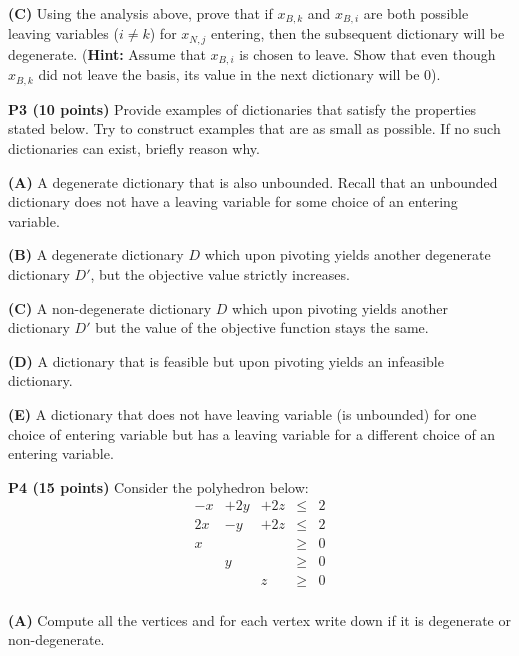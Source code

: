 \documentclass[11pt]{article}
\begin{document}
\medskip


\noindent\textbf{(C)} Using the analysis above, prove that if $x_{B,k}$
and $x_{B,i}$ are both possible leaving variables ($i \not= k$) for $x_{N,j}$ entering,
then  the subsequent dictionary will be degenerate.  (\textbf{Hint:}
Assume that $x_{B,i}$ is chosen to leave. Show that even though $x_{B,k}$ did not leave the basis, its value in
the  next dictionary will be $0$).

\bigskip

\noindent\textbf{P3 (10 points)}  Provide examples of dictionaries
that satisfy the properties stated below. Try to construct
examples that are as small as possible. If no such
dictionaries can exist, briefly reason why.


\noindent\textbf{(A)} A degenerate dictionary that is also unbounded. 
Recall that an unbounded dictionary does not have a leaving variable for some
choice of an entering variable.

\medskip

\noindent\textbf{(B)} A degenerate dictionary $D$ which upon pivoting
yields another degenerate dictionary $D'$, but the objective value strictly
increases.

\medskip

\noindent\textbf{(C)} A non-degenerate dictionary $D$ which upon pivoting
yields another dictionary $D'$ but the value of the objective function
stays the same.

\medskip

\noindent\textbf{(D)} A dictionary that is feasible but upon pivoting
yields an infeasible dictionary.


\medskip

\noindent\textbf{(E)} A dictionary that does not have leaving variable
(is unbounded) for one choice of entering variable but has a leaving
variable for a different choice of an entering variable.

\bigskip

\noindent\textbf{P4 (15 points)}  Consider the polyhedron below:
\[ \begin{array}{ccccc}
 -x & + 2 y & + 2z & \leq & 2 \\
2 x & - y & + 2z & \leq & 2 \\
x & & & \geq & 0\\
& y& & \geq & 0 \\
& & z & \geq & 0 \\
\end{array}\]

\noindent\textbf{(A)} Compute all the vertices and for each vertex
write down if it is degenerate or non-degenerate.
\end{document}
